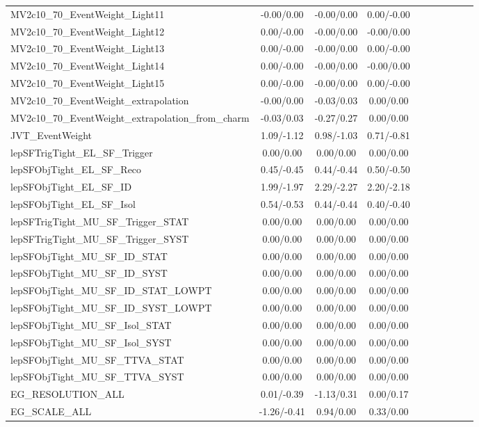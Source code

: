 \begin{table}[h]
\begin{center}
\begin{tabular}{l|ccccccccc}
MV2c10\_70\_EventWeight\_Light11 &-0.00/0.00 &-0.00/0.00 &0.00/-0.00 \\
MV2c10\_70\_EventWeight\_Light12 &0.00/-0.00 &-0.00/0.00 &-0.00/0.00 \\
MV2c10\_70\_EventWeight\_Light13 &0.00/-0.00 &-0.00/0.00 &0.00/-0.00 \\
MV2c10\_70\_EventWeight\_Light14 &0.00/-0.00 &-0.00/0.00 &-0.00/0.00 \\
MV2c10\_70\_EventWeight\_Light15 &0.00/-0.00 &-0.00/0.00 &0.00/-0.00 \\
MV2c10\_70\_EventWeight\_extrapolation &-0.00/0.00 &-0.03/0.03 &0.00/0.00 \\
MV2c10\_70\_EventWeight\_extrapolation\_from\_charm &-0.03/0.03 &-0.27/0.27 &0.00/0.00 \\
JVT\_EventWeight &1.09/-1.12 &0.98/-1.03 &0.71/-0.81 \\
lepSFTrigTight\_EL\_SF\_Trigger &0.00/0.00 &0.00/0.00 &0.00/0.00 \\
lepSFObjTight\_EL\_SF\_Reco &0.45/-0.45 &0.44/-0.44 &0.50/-0.50 \\
lepSFObjTight\_EL\_SF\_ID &1.99/-1.97 &2.29/-2.27 &2.20/-2.18 \\
lepSFObjTight\_EL\_SF\_Isol &0.54/-0.53 &0.44/-0.44 &0.40/-0.40 \\
lepSFTrigTight\_MU\_SF\_Trigger\_STAT &0.00/0.00 &0.00/0.00 &0.00/0.00 \\
lepSFTrigTight\_MU\_SF\_Trigger\_SYST &0.00/0.00 &0.00/0.00 &0.00/0.00 \\
lepSFObjTight\_MU\_SF\_ID\_STAT &0.00/0.00 &0.00/0.00 &0.00/0.00 \\
lepSFObjTight\_MU\_SF\_ID\_SYST &0.00/0.00 &0.00/0.00 &0.00/0.00 \\
lepSFObjTight\_MU\_SF\_ID\_STAT\_LOWPT &0.00/0.00 &0.00/0.00 &0.00/0.00 \\
lepSFObjTight\_MU\_SF\_ID\_SYST\_LOWPT &0.00/0.00 &0.00/0.00 &0.00/0.00 \\
lepSFObjTight\_MU\_SF\_Isol\_STAT &0.00/0.00 &0.00/0.00 &0.00/0.00 \\
lepSFObjTight\_MU\_SF\_Isol\_SYST &0.00/0.00 &0.00/0.00 &0.00/0.00 \\
lepSFObjTight\_MU\_SF\_TTVA\_STAT &0.00/0.00 &0.00/0.00 &0.00/0.00 \\
lepSFObjTight\_MU\_SF\_TTVA\_SYST &0.00/0.00 &0.00/0.00 &0.00/0.00 \\
EG\_RESOLUTION\_ALL &0.01/-0.39 &-1.13/0.31 &0.00/0.17 \\
EG\_SCALE\_ALL &-1.26/-0.41 &0.94/0.00 &0.33/0.00 \\

\end{tabular}
\end{center}
\end{table}

